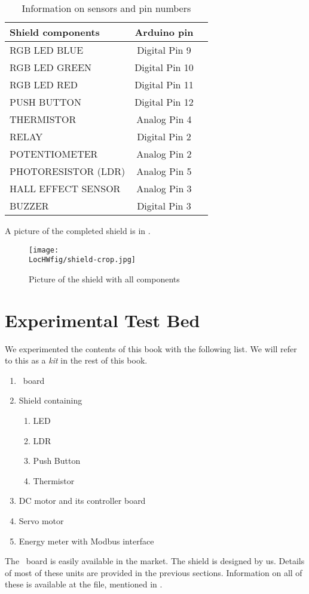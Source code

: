\begin{table}
\centering
\caption{Information on sensors and pin numbers}
\label{shield-table}
\begin{tabular}{ || l | c || r }
 \hline		
{\bf Shield components} & {\bf Arduino pin}\\ \hline	
RGB LED BLUE & Digital Pin 9\\
RGB LED GREEN & Digital Pin 10\\
RGB LED RED & Digital Pin 11\\
PUSH BUTTON & Digital Pin 12\\
THERMISTOR & Analog Pin 4\\
RELAY  & Digital Pin 2\\
POTENTIOMETER & Analog Pin 2\\
PHOTORESISTOR (LDR) & Analog Pin 5\\
HALL EFFECT SENSOR & Analog Pin 3\\
BUZZER & Digital Pin 3\\
 \hline 
\end{tabular}
\end{table}
A picture of the completed shield is in .
\begin{figure}
  \centering
  \texttt{[image: \\LocHWfig/shield-crop.jpg]}
  \caption{Picture of the shield with all components}
  \label{shield}
\end{figure}

\section{Experimental Test Bed}
We experimented the contents of this book with the
following list.  We will refer to this as a \emph{kit} in the rest of
this book.
\begin{enumerate}
\item \arduino\ board
\item Shield containing
\begin{enumerate}
\item LED
\item LDR
\item Push Button
\item Thermistor
\end{enumerate}
\item DC motor and its controller board
\item Servo motor
\item Energy meter with Modbus interface
\end{enumerate}

The \arduino\ board is easily available in the market.  The shield is
designed by us.  Details of most of these units are provided in the
previous sections.  Information on all of these is available at the
file, mentioned in .


